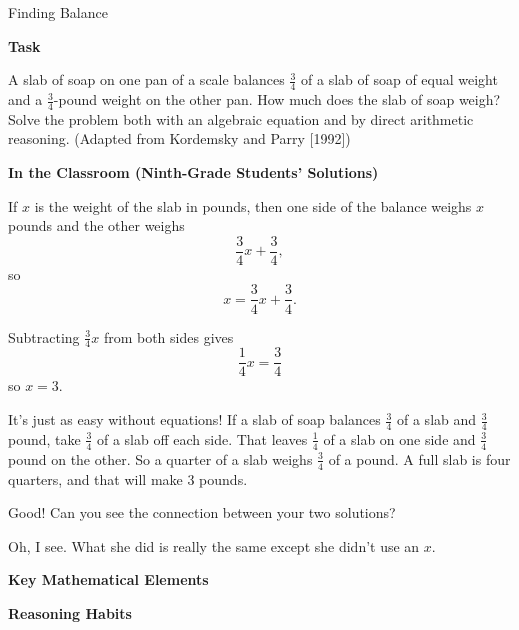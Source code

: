 \TriExample
  {Finding Balance}
  {
    \textbf{Task}

    A slab of soap on one pan of a scale balances $\frac{3}{4}$ of a slab of soap of equal weight and a $\frac{3}{4}$-pound weight on the other pan. How much does the slab of soap weigh? Solve the problem both with an algebraic equation and by direct arithmetic reasoning.  (Adapted from Kordemsky and Parry [1992])

    \textbf{In the Classroom (Ninth-Grade Students' Solutions)}

    \begin{scriptlist}
      \item [Student 1:] If $x$ is the weight of the slab in pounds, then one side of the balance weighs $x$ pounds and the other weighs
      $$
      \frac{3}{4}x+\frac{3}{4},
      $$
      so
      $$
      x=\frac{3}{4}x+\frac{3}{4}.
      $$

      Subtracting $\frac{3}{4}x$ from both sides gives
      $$
      \frac{1}{4}x=\frac{3}{4}
      $$
      so $x=3$.\vspace{.5\baselineskip}

      \item [Student 2:] It's just as easy without equations! If a slab of soap balances $\frac{3}{4}$ of a slab and $\frac{3}{4}$ pound, take $\frac{3}{4}$ of a slab off each side. That leaves $\frac{1}{4}$ of a slab on one side and $\frac{3}{4}$ pound on the other. So a quarter of a slab weighs $\frac{3}{4}$ of a pound. A full slab is four quarters, and that will make $3$ pounds.\vspace{2\baselineskip}
      
      \item [Teacher:] Good! Can you see the connection between your two solutions?
      
      \item [Student 1:] Oh, I see. What she did is really the same except she didn't use an $x$.
    \end{scriptlist}

    \textbf{Key Mathematical Elements}

    \begin{hanglist}
    \end{hanglist}    

    \textbf{Reasoning Habits}

    \begin{hanglist}

    \end{hanglist}    
  }
